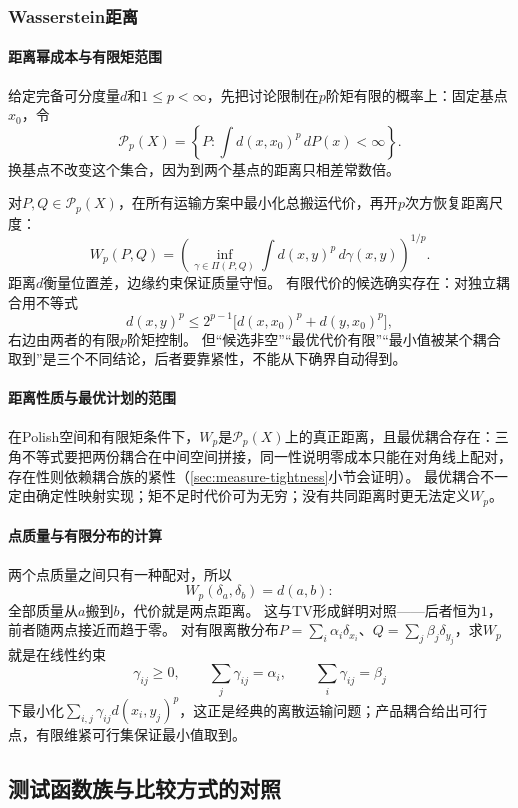 \subsubsection{Wasserstein距离}

\paragraph{距离幂成本与有限矩范围}

给定完备可分度量$d$和$1\leq p<\infty$，先把讨论限制在$p$阶矩有限的概率上：固定基点$x_0$，令
\[
 \mathcal P_p(X)=\left\{P:\int d(x,x_0)^p\,dP(x)<\infty\right\}.
\]
换基点不改变这个集合，因为到两个基点的距离只相差常数倍。

对$P,Q\in\mathcal P_p(X)$，在所有运输方案中最小化总搬运代价，再开$p$次方恢复距离尺度：
\[
 W_p(P,Q)=\left(\inf_{\gamma\in\Pi(P,Q)}
 \int d(x,y)^p\,d\gamma(x,y)\right)^{1/p}.
\]
距离$d$衡量位置差，边缘约束保证质量守恒。
有限代价的候选确实存在：对独立耦合用不等式
\[
 d(x,y)^p\leq2^{p-1}\bigl[d(x,x_0)^p+d(y,x_0)^p\bigr],
\]
右边由两者的有限$p$阶矩控制。
但“候选非空”“最优代价有限”“最小值被某个耦合取到”是三个不同结论，后者要靠紧性，不能从下确界自动得到。

\paragraph{距离性质与最优计划的范围}

在Polish空间和有限矩条件下，$W_p$是$\mathcal P_p(X)$上的真正距离，且最优耦合存在：三角不等式要把两份耦合在中间空间拼接，同一性说明零成本只能在对角线上配对，存在性则依赖耦合族的紧性（\ref{sec:measure-tightness}小节会证明）。
最优耦合不一定由确定性映射实现；矩不足时代价可为无穷；没有共同距离时更无法定义$W_p$。

\paragraph{点质量与有限分布的计算}

两个点质量之间只有一种配对，所以
\[
 W_p(\delta_a,\delta_b)=d(a,b):
\]
全部质量从$a$搬到$b$，代价就是两点距离。
这与TV形成鲜明对照——后者恒为$1$，前者随两点接近而趋于零。
对有限离散分布$P=\sum_i\alpha_i\delta_{x_i}$、$Q=\sum_j\beta_j\delta_{y_j}$，求$W_p$就是在线性约束
\[
 \gamma_{ij}\geq0,\qquad
 \sum_j\gamma_{ij}=\alpha_i,\qquad
 \sum_i\gamma_{ij}=\beta_j
\]
下最小化$\sum_{i,j}\gamma_{ij}d(x_i,y_j)^p$，这正是经典的离散运输问题；产品耦合给出可行点，有限维紧可行集保证最小值取到。

\subsection{测试函数族与比较方式的对照}

